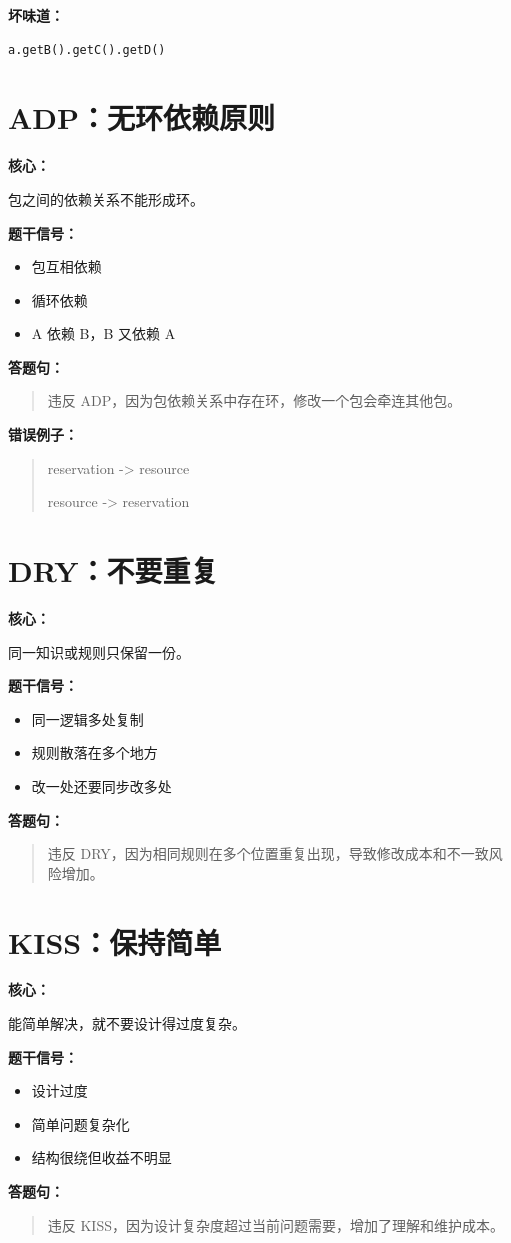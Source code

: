 \documentclass[UTF8,zihao=-4]{ctexart}
\newcommand{\principle}[1]{%
  \section*{\color{TitleBlue}#1}
}
\newcommand{\labeltext}[1]{%
  \textbf{#1}
}
\newenvironment{answerbox}{%
  \begin{quote}\small\color{TextGray}
}{%
  \end{quote}
}
\begin{document}
\labeltext{坏味道：}
\begin{verbatim}
a.getB().getC().getD()
\end{verbatim}

\principle{ADP：无环依赖原则}

\labeltext{核心：}
包之间的依赖关系不能形成环。

\labeltext{题干信号：}
\begin{itemize}
  \item 包互相依赖
  \item 循环依赖
  \item A 依赖 B，B 又依赖 A
\end{itemize}

\labeltext{答题句：}
\begin{answerbox}
违反 ADP，因为包依赖关系中存在环，修改一个包会牵连其他包。
\end{answerbox}

\labeltext{错误例子：}
\begin{answerbox}
reservation -> resource

resource -> reservation
\end{answerbox}

\principle{DRY：不要重复}

\labeltext{核心：}
同一知识或规则只保留一份。

\labeltext{题干信号：}
\begin{itemize}
  \item 同一逻辑多处复制
  \item 规则散落在多个地方
  \item 改一处还要同步改多处
\end{itemize}

\labeltext{答题句：}
\begin{answerbox}
违反 DRY，因为相同规则在多个位置重复出现，导致修改成本和不一致风险增加。
\end{answerbox}

\principle{KISS：保持简单}

\labeltext{核心：}
能简单解决，就不要设计得过度复杂。

\labeltext{题干信号：}
\begin{itemize}
  \item 设计过度
  \item 简单问题复杂化
  \item 结构很绕但收益不明显
\end{itemize}

\labeltext{答题句：}
\begin{answerbox}
违反 KISS，因为设计复杂度超过当前问题需要，增加了理解和维护成本。
\end{answerbox}
\end{document}
